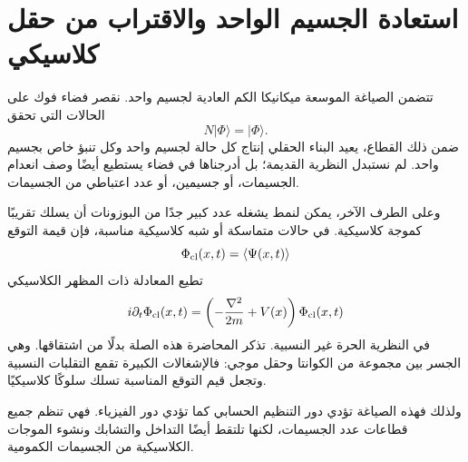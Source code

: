 \begin{classroomqa}
\end{classroomqa}

\begin{classroomqa}
\end{classroomqa}

\section{استعادة الجسيم الواحد والاقتراب من حقل كلاسيكي}

تتضمن الصياغة الموسعة ميكانيكا الكم العادية لجسيم واحد. نقصر فضاء فوك على الحالات التي تحقق
\begin{equation}
N|\Phi\rangle=|\Phi\rangle.
\end{equation}
ضمن ذلك القطاع، يعيد البناء الحقلي إنتاج كل حالة لجسيم واحد وكل تنبؤ خاص بجسيم واحد. لم نستبدل النظرية القديمة؛ بل أدرجناها في فضاء يستطيع أيضًا وصف انعدام الجسيمات، أو جسيمين، أو عدد اعتباطي من الجسيمات.

وعلى الطرف الآخر، يمكن لنمط يشغله عدد كبير جدًا من البوزونات أن يسلك تقريبًا كموجة كلاسيكية. في حالات متماسكة أو شبه كلاسيكية مناسبة، فإن قيمة التوقع
\begin{equation}
\Phi_{\rm cl}(x,t)=\langle\Psi(x,t)\rangle
\end{equation}
تطيع المعادلة ذات المظهر الكلاسيكي
\begin{equation}
i\partial_t\Phi_{\rm cl}(x,t)
=\left(-\frac{\nabla^2}{2m}+V(x)\right)\Phi_{\rm cl}(x,t)
\label{eq:l07-classical-schrodinger}
\end{equation}
في النظرية الحرة غير النسبية. تذكر المحاضرة هذه الصلة بدلًا من اشتقاقها. وهي الجسر بين مجموعة من الكوانتا وحقل موجي: فالإشغالات الكبيرة تقمع التقلبات النسبية وتجعل قيم التوقع المناسبة تسلك سلوكًا كلاسيكيًا.

ولذلك فهذه الصياغة تؤدي دور التنظيم الحسابي كما تؤدي دور الفيزياء. فهي تنظم جميع قطاعات عدد الجسيمات، لكنها تلتقط أيضًا التداخل والتشابك ونشوء الموجات الكلاسيكية من الجسيمات الكمومية.

